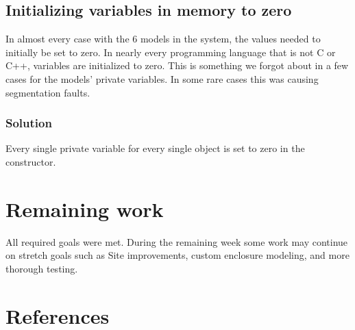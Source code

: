 \documentclass[onecolumn, draftclsnofoot,10pt, compsoc]{IEEEtran}
\begin{document}
		\subsection{Initializing variables in memory to zero}
			In almost every case with the 6 models in the system, the values needed to initially be set to zero.
			In nearly every programming language that is not C or C++, variables are initialized to zero.
			This is something we forgot about in a few cases for the models' private variables.
			In some rare cases this was causing segmentation faults.

			\subsubsection{Solution}
				Every single private variable for every single object is set to zero in the constructor.


	\section{Remaining work}
	All required goals were met.
	During the remaining week some work may continue on stretch goals such as Site improvements, custom enclosure modeling, and more thorough testing.


	\section{References}
			\begingroup
				\renewcommand{\addcontentsline}[3]{}%
				\renewcommand{\section}[2]{}%
				
				
			\endgroup
\end{document}
